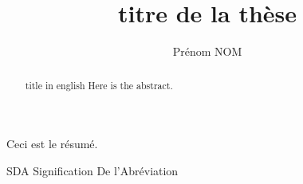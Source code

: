 \documentclass [memoire, letterpaper, oneside, fleqn,12pt]{thETS-latin1}
\title{titre de la thèse}
\author{Prénom NOM}
\begin{document}

\maketitle

\presentjury

\begin{avantpropos}

\end{avantpropos}

\begin{remerciements}

\end{remerciements}

\begin{sommaire}
Ceci est le résumé.
\end{sommaire} 


\begin{abstract}{title in english}
Here is the abstract.
\end{abstract}


\tableofcontents

\listoftables

\listoffigures

\begin{listofabbr}[3cm]
\item[SDA] Signification De l'Abréviation
\end{listofabbr}
\end{document}
